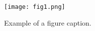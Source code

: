 \blindtext

\begin{figure}[htbp]
\centerline{\texttt{[image: fig1.png]}}
\caption{Example of a figure caption.}
\label{fig}
\end{figure}
